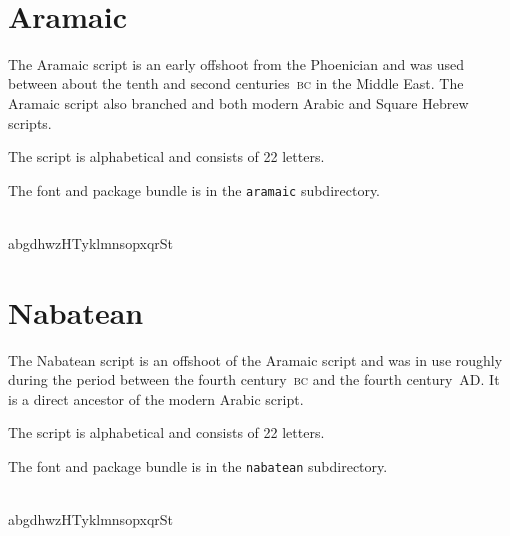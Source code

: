 \documentclass{article}
\newcommand{\BC}{\textsc{bc}}
\begin{document}
\begin{center}
\copsnfamily
\Oa\ \Oi\ \Ou\ \Oka\ \Oku\ 
\Oxa\ \Oga\ \Ogu\ \Oca\ \Oja\ 
\Oji\ \Ota\ \Otu\ \Otha\ \Occa\ 
\Oda\ \Odi\ \Odu\ \Ona\ \Onu\ 
\Opa\ \Ofa\ \Oba\ \Oma\ \Omi\ 
\Omu\ \Oya\ \Ora\ \Oru\ \Ola\ 
\Ova\ \Ovi\ \Osa\ \Osva\ \Oza\ 
\Oha\ 
\Oking\ \Ocountrya\ \Ocountryb\ \Oearth\ \Ogod\ 
\OAura\ \OAurb\ \OAurc\ 
\Owd
\end{center}

\section{Aramaic}

    The Aramaic script is an early offshoot from the Phoenician and was used
between about the tenth and second centuries~\BC{} in the Middle East.
The Aramaic script also branched and both modern Arabic and Square Hebrew
scripts.

    The script is alphabetical and consists of 22 letters.

The font and package bundle is in the \texttt{aramaic} subdirectory.

\begin{center}
\aramfamily
\Aaleph \Abeth \Agimel \Adaleth \Ahe \Avav \Azayin \Aheth \Ateth
\Ayod \Akaph \Alamed \Amem \Anun \Asamekh \Aayin \Ape \Asade \Aqoph 
\Aresh \Ashin \Atav \\
abgdhwzHTyklmnsopxqrSt
\end{center}

\section{Nabatean}

    The Nabatean script is an offshoot of the Aramaic script and was in use 
roughly during the period between the fourth century~\BC{} and the fourth 
century~AD. It is a direct ancestor of the modern Arabic script.

    The script is alphabetical and consists of 22 letters.

The font and package bundle is in the \texttt{nabatean} subdirectory.

\begin{center}
\nabfamily
\Aaleph \Abeth \Agimel \Adaleth \Ahe \Avav \Azayin \Aheth \Ateth
\Ayod \Akaph \Alamed \Amem \Anun \Asamekh \Aayin \Ape \Asade \Aqoph 
\Aresh \Ashin \Atav \\
abgdhwzHTyklmnsopxqrSt
\end{center}
\end{document}
